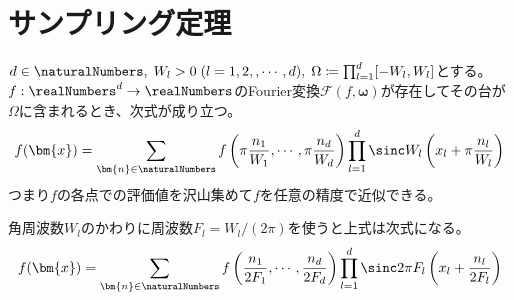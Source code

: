 	\chapter{サンプリング定理}
		\begin{shadebox}
			$d\in\naturalNumbers,\;W_l>0\;(l=1,2,,\cdots,d),\;\Omega\coloneqq\prod_{l=1}^d [-W_l,W_l]$とする。
			$f:\realNumbers^d\to\realNumbers$のFourier変換$\mathcal{F}(f,\bm{\omega})$が存在してその台が$\Omega$に含まれるとき、次式が成り立つ。
			\[ f(\bm{x}) = \sum_{\bm{n}\in\naturalNumbers}f\left(\pi\frac{n_1}{W_1},\cdots,\pi\frac{n_d}{W_d}\right)\prod_{l=1}^d\sinc W_l\left(x_l + \pi\frac{n_l}{W_l}\right) \]
			つまり$f$の各点での評価値を沢山集めて$f$を任意の精度で近似できる。
			\par
			角周波数$W_l$のかわりに周波数$F_l=W_l/(2\pi)$を使うと上式は次式になる。
			\[ f(\bm{x}) = \sum_{\bm{n}\in\naturalNumbers}f\left(\frac{n_1}{2F_1},\cdots,\frac{n_d}{2F_d}\right)\prod_{l=1}^d\sinc 2\pi F_l\left(x_l + \frac{n_l}{2F_l}\right) \]
		\end{shadebox}
